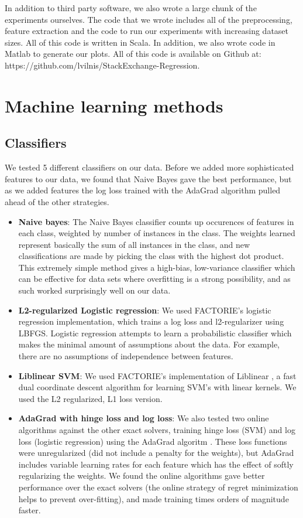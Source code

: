 \documentclass[11pt]{article}
\begin{document}
In addition to third party software, we also wrote a large chunk of
the experiments ourselves.  The code that we wrote includes all of the
preprocessing, feature extraction and the code to run our experiments
with increasing dataset sizes.  All of this code is written in
Scala. In addition, we also wrote code in Matlab to generate our
plots.  All of this code is available on Github at:
https://github.com/lvilnis/StackExchange-Regression.

\section{Machine learning methods}
\subsection*{Classifiers}We tested 5 different classifiers on our data. Before we added more sophisticated features to our data, we found that Naive Bayes gave the best performance, but as we added features the log loss trained with the AdaGrad algorithm pulled ahead of the other strategies.
 \begin{itemize}
\item \textbf{Naive bayes}: The Naive Bayes classifier counts up occurences of features in each class, weighted by number of instances in the class. The weights learned represent basically the sum of all instances in the class, and new classifications are made by picking the class with the highest dot product. This extremely simple method gives a high-bias, low-variance classifier which can be effective for data sets where overfitting is a strong possibility, and as such worked surprisingly well on our data.
\item \textbf{L2-regularized Logistic regression}: We used FACTORIE's logistic regression implementation, which trains a log loss and l2-regularizer using LBFGS. Logistic regression attempts to learn a probabilistic classifier which makes the minimal amount of assumptions about the data. For example, there are no assumptions of independence between features.
\item \textbf{Liblinear SVM}: We used FACTORIE's implementation of Liblinear \cite{chang:08a}, a fast dual coordinate descent algorithm for learning SVM's with linear kernels. We used the L2 regularized, L1 loss version.
\item \textbf{AdaGrad with hinge loss and log loss}: We also tested two online algorithms against the other exact solvers, training hinge loss (SVM) and log loss (logistic regression) using the AdaGrad algoritm \cite{duchi:11a}. These loss functions were unregularized (did not include a penalty for the weights), but AdaGrad includes variable learning rates for each feature which has the effect of softly regularizing the weights. We found the online algorithms gave better performance over the exact solvers (the online strategy of regret minimization helps to prevent over-fitting), and made training times orders of magnitude faster.
\end{itemize}
\end{document}
